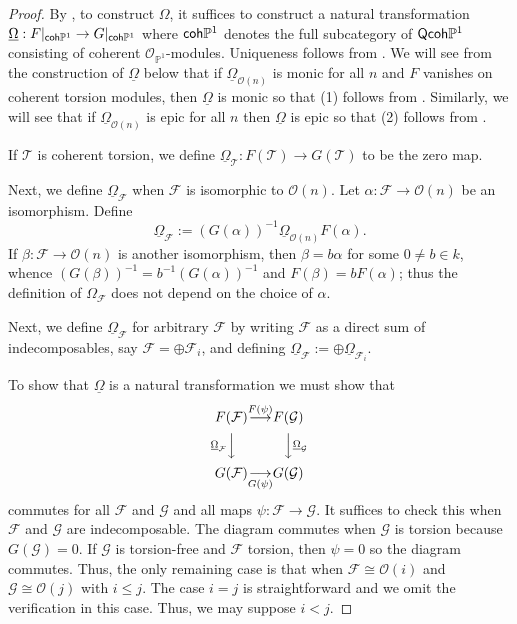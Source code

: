 \documentclass[10pt]{amsart}
\theoremstyle{definition}
\theoremstyle{remark}
\numberwithin{equation}{section}
\begin{document}
\begin{proof}
By \cite[Lemma 7.5]{N}, to construct $\Omega$, it suffices to construct a natural transformation $\underline{\Omega}:F|_{{\sf coh} \mathbb{P}^{1}} \rightarrow G|_{{\sf coh} \mathbb{P}^{1}}$ where ${\sf coh }\mathbb{P}^{1}$ denotes the full subcategory of ${\sf Qcoh }\mathbb{P}^{1}$ consisting of coherent $\mathcal{O}_{\mathbb{P}^{1}}$-modules.  Uniqueness follows from \cite[Lemma 7.5]{N}.  We will see from the construction of $\underline{\Omega}$ below that if $\underline{\Omega}_{\mathcal{O}(n)}$ is monic for all $n$ and $F$ vanishes on coherent torsion modules, then $\underline{\Omega}$ is monic so that (1) follows from \cite[Lemma 7.5]{N}.  Similarly, we will see that if $\underline{\Omega}_{\mathcal{O}(n)}$ is epic for all $n$ then $\underline{\Omega}$ is epic so that (2) follows from \cite[Lemma 7.5]{N}.

If $\mathcal{T}$ is coherent torsion, we define $\underline{\Omega}_{\mathcal{T}}:F(\mathcal{T}) \rightarrow G(\mathcal{T})$ to be the zero map.

Next, we define $\underline{\Omega}_{\mathcal{F}}$ when
$\mathcal{F}$ is isomorphic to $\mathcal{O}(n)$.  Let $\alpha:
\mathcal{F} \rightarrow \mathcal{O}(n)$ be an isomorphism.  Define
$$
\underline{\Omega}_{\mathcal{F}}:=(G (\alpha))^{-1}
\underline{\Omega}_{\mathcal{O}(n)}  F (\alpha).
$$
If $\beta: \mathcal{F} \rightarrow \mathcal{O}(n)$ is another
isomorphism, then $\beta = b \alpha$ for some $0 \neq
b \in k$, whence $(G (\beta))^{-1}=b^{-1}(G
(\alpha))^{-1}$ and $F (\beta) = b F (\alpha)$; thus the
definition of $\Omega_{\mathcal{F}}$ does not depend on the choice
of $\alpha$.

Next, we define $\underline{\Omega}_{\mathcal{F}}$ for arbitrary $\mathcal{F}$ by writing $\mathcal{F}$ as a direct sum of indecomposables, say $\mathcal{F}=\oplus \mathcal{F}_{i}$, and defining $\underline{\Omega}_{\mathcal{F}}:=\oplus \underline{\Omega}_{\mathcal{F}_{i}}$.

To show that $\underline{\Omega}$ is a natural transformation we
must show that
\begin{equation} \label{eqn.welldefined}
\begin{CD}
F (\mathcal{F}) & \overset{F(\psi)}{\longrightarrow} & F (\mathcal{G}) \\
@V{\underline{\Omega}_{\mathcal{F}}}VV @VV{\underline{\Omega}_{\mathcal{G}}}V \\
G (\mathcal{F}) & \underset{G(\psi)}{\longrightarrow} & G (\mathcal{G})
\end{CD}
\end{equation}
commutes for all $\mathcal{F}$ and $\mathcal{G}$ and all maps
$\psi:\mathcal{F} \rightarrow \mathcal{G}$.  It suffices to check
this when $\mathcal{F}$ and $\mathcal{G}$ are indecomposable.  The
diagram commutes when $\mathcal{G}$ is torsion because $G(
\mathcal{G})=0$.  If $\mathcal{G}$ is torsion-free and
$\mathcal{F}$ torsion, then $\psi=0$ so the diagram commutes.  Thus,
the only remaining case is that when $\mathcal{F} \cong
\mathcal{O}(i)$ and $\mathcal{G} \cong \mathcal{O}(j)$ with $i
\leq j$.  The case $i=j$ is straightforward and we omit the verification in this case.
Thus, we may suppose $i<j$.


\end{proof}
\end{document}
